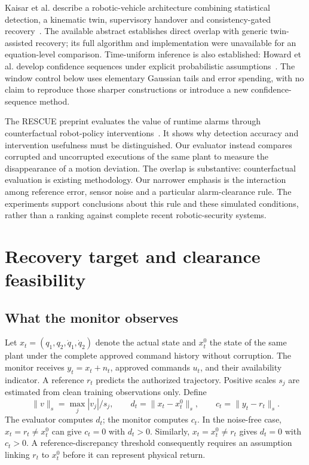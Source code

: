\documentclass[11pt]{article}
\begin{document}
Kaisar et al. describe a robotic-vehicle architecture combining statistical detection, a kinematic twin, supervisory handover and consistency-gated recovery~\cite{kaisar}. The available abstract establishes direct overlap with generic twin-assisted recovery; its full algorithm and implementation were unavailable for an equation-level comparison. Time-uniform inference is also established: Howard et al. develop confidence sequences under explicit probabilistic assumptions~\cite{howard}. The window control below uses elementary Gaussian tails and error spending, with no claim to reproduce those sharper constructions or introduce a new confidence-sequence method.

The RESCUE preprint evaluates the value of runtime alarms through counterfactual robot-policy interventions~\cite{rescue}. It shows why detection accuracy and intervention usefulness must be distinguished. Our evaluator instead compares corrupted and uncorrupted executions of the same plant to measure the disappearance of a motion deviation. The overlap is substantive: counterfactual evaluation is existing methodology. Our narrower emphasis is the interaction among reference error, sensor noise and a particular alarm-clearance rule. The experiments support conclusions about this rule and these simulated conditions, rather than a ranking against complete recent robotic-security systems.

\section{Recovery target and clearance feasibility}
\subsection{What the monitor observes}
Let $x_t=(q_1,q_2,\dot q_1,\dot q_2)$ denote the actual state and $x_t^0$ the state of the same plant under the complete approved command history without corruption. The monitor receives $y_t=x_t+n_t$, approved commands $u_t$, and their availability indicator. A reference $r_t$ predicts the authorized trajectory. Positive scales $s_j$ are estimated from clean training observations only. Define
\begin{equation}
 \|v\|_s=\max_j |v_j|/s_j,\qquad
 d_t=\|x_t-x_t^0\|_s,\qquad c_t=\|y_t-r_t\|_s.
 \label{eq:discrepancies}
\end{equation}
The evaluator computes $d_t$; the monitor computes $c_t$. In the noise-free case, $x_t=r_t\ne x_t^0$ can give $c_t=0$ with $d_t>0$. Similarly, $x_t=x_t^0\ne r_t$ gives $d_t=0$ with $c_t>0$. A reference-discrepancy threshold consequently requires an assumption linking $r_t$ to $x_t^0$ before it can represent physical return.
\end{document}

